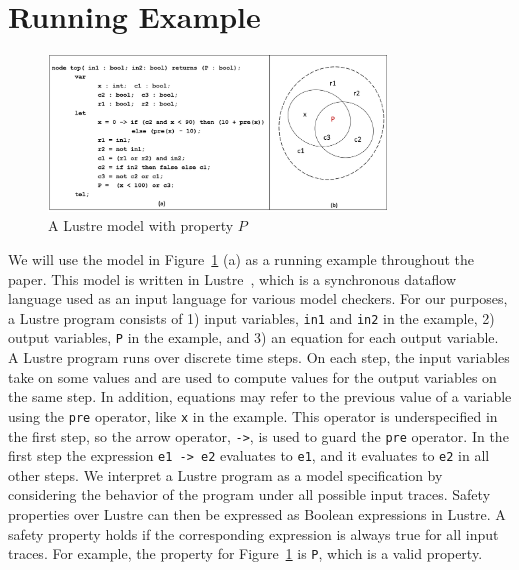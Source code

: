 \section{Running Example}
\label{sec:example}

\begin{figure}
\begin{center}
\includegraphics[width=0.8\textwidth]{figs/ex.png}
\vspace{-0.1in}
\caption{A Lustre model with property $P$}\label{fig:ex}
\end{center}
\end{figure}

We will use the model in Figure~\ref{fig:ex} (a) as
a running example throughout the paper. This model is written in Lustre~\cite{Halbwachs91:lustre}, which is a synchronous dataflow language used as an input language for various model checkers. For our purposes, a Lustre program
consists of 1) input variables, {\tt in1} and {\tt in2} in the example, 2) output
variables, {\tt P} in the example, and 3) an
equation for each output variable. A Lustre program runs over discrete
time steps. On each step, the input variables take on some values and
are used to compute values for the output variables on the same step.
In addition, equations may refer to the previous value of a variable
using the {\tt pre} operator, like {\tt x} in the example. This operator is underspecified in the
first step, so the arrow operator, {\tt ->}, is used to guard the
{\tt pre} operator. In the first step the expression {\tt e1 -> e2}
evaluates to {\tt e1}, and it evaluates to {\tt e2} in all other steps. We interpret a Lustre program as a model specification by considering
the behavior of the program under all possible input traces. Safety
properties over Lustre can then be expressed as Boolean expressions in
Lustre. A safety property holds if the corresponding expression is
always true for all input traces. For example, the property for
Figure~\ref{fig:ex} is {\tt P}, which is a valid property.


